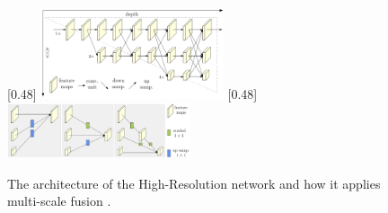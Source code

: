\documentclass[conference]{IEEEtran}
\begin{document}
\begin{figure}[h]
	\centering
	[0.48\textwidth]{%
		\includegraphics[width=0.48\textwidth]{single_pose_estimation_HRNet}%
	}
	[0.48\textwidth]{%
		\includegraphics[width=0.48\textwidth]{single_pose_estimation_multi-scale_fusion}%
	}
	\caption{
		The architecture of the High-Resolution network and how it applies multi-scale fusion \cite{Sun2019}.
	}
	\label{fig:HRNet}
\end{figure}
\end{document}
